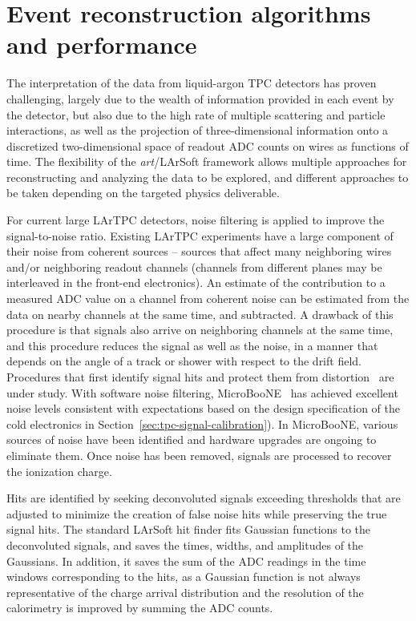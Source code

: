 \section{Event reconstruction algorithms and performance}
\label{sec:larsoftreco}

The interpretation of the data from liquid-argon TPC detectors has
proven challenging, largely due to the wealth of information provided
in each event by the detector, but also due to the high rate of
multiple scattering and particle interactions, as well as the
projection of three-dimensional information onto a discretized
two-dimensional space of readout ADC counts on wires as functions of
time.  The flexibility of the {\textit{art}}/LArSoft framework allows
multiple approaches for reconstructing and analyzing the data to be
explored, and different approaches to be taken depending on the targeted
physics deliverable.


For current large LArTPC detectors, noise filtering is applied to improve
the signal-to-noise ratio.  Existing LArTPC experiments have a
large component of their noise from coherent sources -- sources that
affect many neighboring wires and/or neighboring readout channels
(channels from different planes may be interleaved in the front-end
electronics).  An estimate of the contribution to a measured ADC value on a channel from
coherent noise can be estimated from the data on nearby channels at the same time, and subtracted.
A drawback of this procedure is that signals also arrive on neighboring
channels at the same time, and this procedure reduces the signal as
well as the noise, in a manner that depends on the angle of a track or
shower with respect to the drift field.  Procedures that first
identify signal hits and protect them from distortion~\cite{microboone-noise} 
are under study. With software noise filtering, MicroBooNE~\cite{noise_filter}
has achieved excellent noise levels consistent with expectations based on 
the design specification of the cold electronics %
in Section~\ref{sec:tpc-signal-calibration}).  In MicroBooNE, various 
sources of noise have been identified and hardware upgrades 
are ongoing to eliminate them.   Once noise has been removed,
signals are processed to recover the ionization charge.

Hits are identified by seeking deconvoluted signals exceeding
thresholds that are adjusted to minimize the creation of false noise
hits while preserving the true signal hits.  The standard LArSoft hit
finder fits Gaussian functions to the deconvoluted signals, and saves the
times, widths, and amplitudes of the Gaussians.  In addition, it saves the sum of
the ADC readings in the time windows corresponding to the hits, as a
Gaussian function is not always representative of the charge arrival
distribution and the resolution of the calorimetry is improved by
summing the ADC counts.

